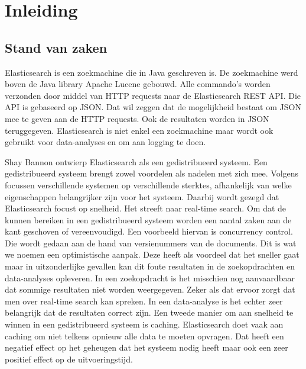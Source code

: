 
\chapter{Inleiding}
\label{ch:inleiding}

\section{Stand van zaken}
\label{sec:stand-van-zaken}

Elasticsearch is een zoekmachine die in Java geschreven is. De zoekmachine werd boven de Java library Apache Lucene gebouwd. Alle commando's worden verzonden door middel van HTTP requests naar de Elasticsearch REST API. Die API is gebaseerd op JSON. Dat wil zeggen dat de mogelijkheid bestaat om JSON mee te geven aan de HTTP requests. Ook de resultaten worden in JSON teruggegeven. Elasticsearch is niet enkel een zoekmachine maar wordt ook gebruikt voor data-analyses en om aan logging te doen. 

Shay Bannon ontwierp Elasticsearch als een gedistribueerd systeem. Een gedistribueerd systeem brengt zowel voordelen als nadelen met zich mee. Volgens \textcite{Brasetvik2013} focussen verschillende systemen op verschillende sterktes, afhankelijk van welke eigenschappen belangrijker zijn voor het systeem. Daarbij wordt gezegd dat Elasticsearch focust op snelheid. Het streeft naar real-time search. Om dat de kunnen bereiken in een gedistribueerd systeem worden een aantal zaken aan de kant geschoven of vereenvoudigd. Een voorbeeld hiervan is concurrency control. Die wordt gedaan aan de hand van versienummers van de documents. Dit is wat we noemen een optimistische aanpak. Deze heeft als voordeel dat het sneller gaat maar in uitzonderlijke gevallen kan dit foute resultaten in de zoekopdrachten en data-analyses opleveren. In een zoekopdracht is het misschien nog aanvaardbaar dat sommige resultaten niet worden weergegeven. Zeker als dat ervoor zorgt dat men over real-time search kan spreken. In een data-analyse is het echter zeer belangrijk dat de resultaten correct zijn. Een tweede manier om aan snelheid te winnen in een gedistribueerd systeem is caching. Elasticsearch doet vaak aan caching om niet telkens opnieuw alle data te moeten opvragen. Dat heeft een negatief effect op het geheugen dat het systeem nodig heeft maar ook een zeer positief effect op de uitvoeringstijd.

